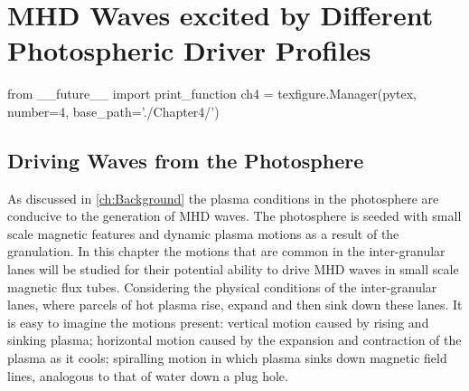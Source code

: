 
\chapter{MHD Waves excited by Different Photospheric Driver Profiles}

\begin{pycode}[chapter4]
from __future__ import print_function
ch4 = texfigure.Manager(pytex, number=4, base_path='./Chapter4/')
\end{pycode}


\section{Driving Waves from the Photosphere}\label{sec:5drivers}

As discussed in \cref{ch:Background} the plasma conditions in the photosphere are conducive to the generation of MHD waves.
The photosphere is seeded with small scale magnetic features and dynamic plasma motions as a result of the granulation.
In this chapter the motions that are common in the inter-granular lanes will be studied for their potential ability to drive MHD waves in small scale magnetic flux tubes.
Considering the physical conditions of the inter-granular lanes, where parcels of hot plasma rise, expand and then sink down these lanes.
It is easy to imagine the motions present: vertical motion caused by rising and sinking plasma; horizontal motion caused by the expansion and contraction of the plasma as it cools; spiralling motion in which plasma sinks down magnetic field lines, analogous to that of water down a plug hole.

